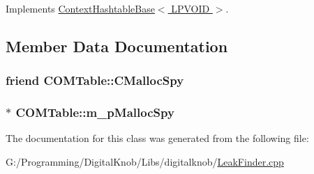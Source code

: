 Implements \hyperlink{class_context_hashtable_base_adec5d46fd137c9d770538fa843a79cba}{Context\-Hashtable\-Base$<$ L\-P\-V\-O\-I\-D $>$}.



\subsection{Member Data Documentation}
\hypertarget{class_c_o_m_table_a7064e228ac38b5f3728245cb7e4f2c0d}{
\subsubsection[{C\-Malloc\-Spy}]{\setlength{\rightskip}{0pt plus 5cm}friend C\-O\-M\-Table\-::\-C\-Malloc\-Spy}}\label{class_c_o_m_table_a7064e228ac38b5f3728245cb7e4f2c0d}
\hypertarget{class_c_o_m_table_a336f19d0e1e80472cdef914089b2df8f}{
\subsubsection[{m\-\_\-p\-Malloc\-Spy}]{$\ast$ C\-O\-M\-Table\-::m\-\_\-p\-Malloc\-Spy}}\label{class_c_o_m_table_a336f19d0e1e80472cdef914089b2df8f}


The documentation for this class was generated from the following file\-:\begin{DoxyCompactItemize}
\item 
G\-:/\-Programming/\-Digital\-Knob/\-Libs/digitalknob/\hyperlink{_leak_finder_8cpp}{Leak\-Finder.\-cpp}\end{DoxyCompactItemize}
